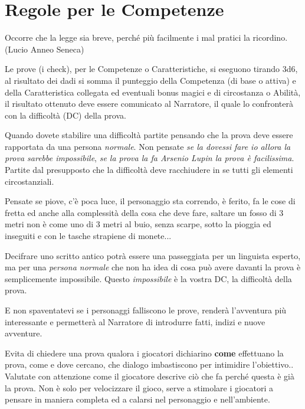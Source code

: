 \section{Regole per le Competenze}

\begin{enfasi}{
Occorre che la legge sia breve, perché più facilmente i mal pratici la ricordino. (Lucio Anneo Seneca)}\end{enfasi}

\begin{multicols}{2}

Le prove (i check), per le Competenze o Caratteristiche, si eseguono tirando 3d6, al risultato dei dadi si somma il punteggio della Competenza (di base o attiva) e della Caratteristica collegata ed eventuali bonus magici e di circostanza o Abilità, il risultato ottenuto deve essere comunicato al Narratore, il quale lo confronterà con la difficoltà (DC) della prova.

Quando dovete stabilire una difficoltà partite pensando che la prova deve essere rapportata da una persona \emph{normale}. Non pensate \emph{se la dovessi fare io allora la prova sarebbe impossibile}, \emph{se la prova la fa Arsenio Lupin la prova è facilissima}. Partite dal presupposto che la difficoltà deve racchiudere in se tutti gli elementi circostanziali.

Pensate se piove, c'è poca luce, il personaggio sta correndo, è ferito, fa le cose di fretta ed anche alla complessità della cosa che deve fare, saltare un fosso di 3 metri non è come uno di 3 metri al buio, senza scarpe, sotto la pioggia ed inseguiti e con le tasche strapiene di monete...

Decifrare uno scritto antico potrà essere una passeggiata per un linguista esperto, ma per una \emph{persona normale} che non ha idea di cosa può avere davanti la prova è semplicemente impossibile. Questo \emph{impossibile} è la vostra DC, la difficoltà della prova.

E non spaventatevi se i personaggi falliscono le prove, renderà l'avventura più interessante e permetterà al Narratore di introdurre fatti, indizi e nuove avventure.

\begin{narratore}
Evita di chiedere una prova qualora i giocatori dichiarino \textbf{come} effettuano la prova, come e dove cercano, che dialogo imbastiscono per intimidire l'obiettivo.. Valutate con attenzione come il giocatore descrive ciò che fa perché questa è già la prova. Non è solo per velocizzare il gioco, serve a stimolare i giocatori a pensare in maniera completa ed a calarsi nel personaggio e nell'ambiente.


\end{narratore}
\end{multicols}
